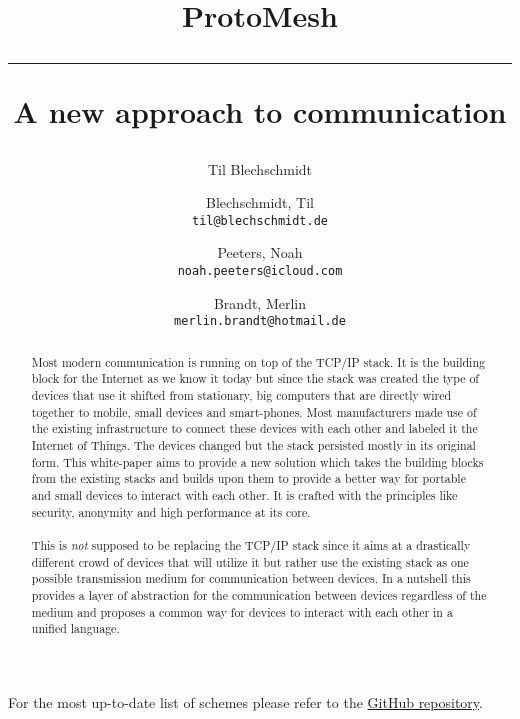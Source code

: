 \documentclass[a4paper]{report}
\title{ProtoMesh \\
    \noindent\rule[0.25ex]{\linewidth}{0.5pt}
    \large A new approach to communication
}
\author{Til Blechschmidt}
\author{
  Blechschmidt, Til\\
  \texttt{til@blechschmidt.de}
  \and
  Peeters, Noah\\
  \texttt{noah.peeters@icloud.com}
  \and
  Brandt, Merlin\\
  \texttt{merlin.brandt@hotmail.de}
}
\begin{document}
	\thispagestyle{fancy}
	\maketitle
	\newpage
	
	\begin{abstract}
	    Most modern communication is running on top of the TCP/IP stack. It is the building block for the Internet as we know it today but since the stack was created the type of devices that use it shifted from stationary, big computers that are directly wired together to mobile, small devices and smart-phones. Most manufacturers made use of the existing infrastructure to connect these devices with each other and labeled it the Internet of Things. The devices changed but the stack persisted mostly in its original form. This white-paper aims to provide a new solution which takes the building blocks from the existing stacks and builds upon them to provide a better way for portable and small devices to interact with each other. It is crafted with the principles like security, anonymity and high performance at its core.\\
	    \\
	    This is \emph{not} supposed to be replacing the TCP/IP stack since it aims at a drastically different crowd of devices that will utilize it but rather use the existing stack as one possible transmission medium for communication between devices. In a nutshell this provides a layer of abstraction for the communication between devices regardless of the medium and proposes a common way for devices to interact with each other in a unified language.
	\end{abstract}
	\newpage
	
	\tableofcontents
	\listoflistings
	For the most up-to-date list of schemes please refer to the \href{https://github.com/TheMegaTB/ProtoMesh/tree/master/schemes}{GitHub repository}.
	\newpage
	
	
\end{document}
